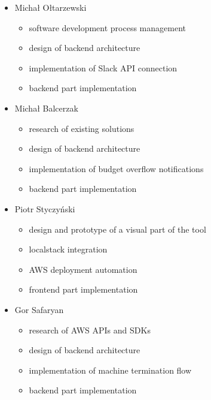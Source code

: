 \documentclass[licencjacka,en]{thesisclass}
\begin{document}
    \begin{itemize}
        \item Michał Ołtarzewski
        \begin{itemize}
            \item software development process management
            \item design of backend architecture
            \item implementation of Slack API connection
            \item backend part implementation
        \end{itemize}
        \item Michał Balcerzak
        \begin{itemize}
            \item research of existing solutions
            \item design of backend architecture
            \item implementation of budget overflow notifications
            \item backend part implementation
        \end{itemize}
        \item Piotr Styczyński
        \begin{itemize}
            \item design and prototype of a visual part of the tool
            \item localstack integration
            \item AWS deployment automation
            \item frontend part implementation
        \end{itemize}
        \item Gor Safaryan
        \begin{itemize}
            \item research of AWS APIs and SDKs
            \item design of backend architecture
            \item implementation of machine termination flow
            \item backend part implementation
        \end{itemize}
    \end{itemize}
\end{document}
